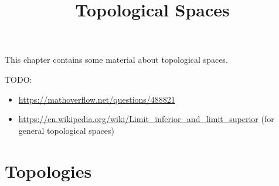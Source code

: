 

%



\title{Topological Spaces}

\maketitle

\label{section-phantom}

This chapter contains some material about topological spaces.

\ChapterTableOfContents

TODO:
\begin{itemize}
    \item \url{https://mathoverflow.net/questions/488821}
    \item \url{https://en.wikipedia.org/wiki/Limit_inferior_and_limit_superior} (for general topological spaces)
\end{itemize}
\section{Topologies}\label{section-topologies}
